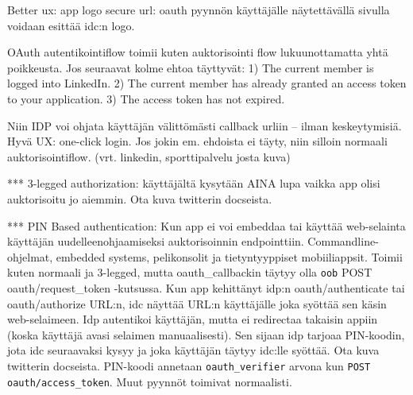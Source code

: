 \documentclass[finnish,gradu]{tktltiki}
\begin{document}



  Better ux: app logo secure url: oauth pyynnön käyttäjälle näytettävällä sivulla voidaan esittää idc:n logo.

  OAuth autentikointiflow toimii kuten auktorisointi flow lukuunottamatta yhtä poikkeusta. Jos seuraavat kolme ehtoa täyttyvät:
  1) The current member is logged into LinkedIn.
  2) The current member has already granted an access token to your application.
  3) The access token has not expired.

  Niin IDP voi ohjata käyttäjän välittömästi callback urliin -- ilman keskeytymisiä. Hyvä UX: one-click login. Jos jokin em. ehdoista ei täyty, niin silloin normaali auktorisointiflow. (vrt. linkedin, sporttipalvelu josta kuva)

  *** 3-legged authorization: käyttäjältä kysytään AINA lupa vaikka app olisi auktorisoitu jo aiemmin. Ota kuva twitterin docseista. %

  *** PIN Based authentication: Kun app ei voi embeddaa tai käyttää web-selainta käyttäjän uudelleenohjaamiseksi auktorisoinnin endpointtiin. Commandline-ohjelmat, embedded systems, pelikonsolit ja tietyntyyppiset mobiiliappsit. Toimii kuten normaali ja 3-legged, mutta oauth\_callbackin täytyy olla \verb!oob! POST oauth/request\_token -kutsussa. Kun app kehittänyt idp:n oauth/authenticate tai oauth/authorize URL:n, idc näyttää URL:n käyttäjälle joka syöttää sen käsin web-selaimeen. Idp autentikoi käyttäjän, mutta ei redirectaa takaisin appiin (koska käyttäjä avasi selaimen manuaalisesti). Sen sijaan idp tarjoaa PIN-koodin, jota idc seuraavaksi kysyy ja joka käyttäjän täytyy idc:lle syöttää. Ota kuva twitterin docseista. PIN-koodi annetaan \verb!oauth_verifier! arvona kun \verb!POST oauth/access_token!. Muut pyynnöt toimivat normaalisti.
\end{document}
